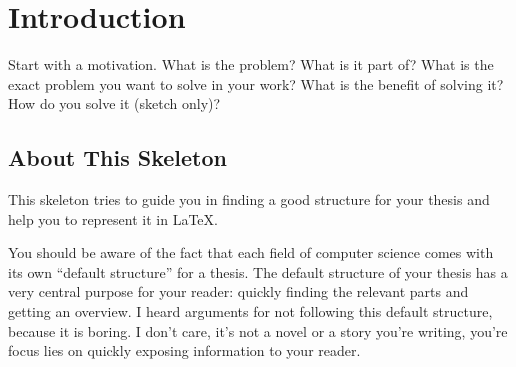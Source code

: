 
\chapter{Introduction}
	Start with a motivation.
	What is the problem?
	What is it part of?
	What is the exact problem you want to solve in your work?
	What is the benefit of solving it?
	How do you solve it (sketch only)?

	
	\section{About This Skeleton}
		This skeleton tries to guide you in finding a good structure for your thesis and help you to represent it in \LaTeX.
		
		You should be aware of the fact that each field of computer science comes with its own ``default structure'' for a thesis.
		The default structure of your thesis has a very central purpose for your reader: quickly finding the relevant parts and getting an overview.
		I heard arguments for not following this default structure, because it is boring.
		I don't care, it's not a novel or a story you're writing, you're focus lies on quickly exposing information to your reader.
		
